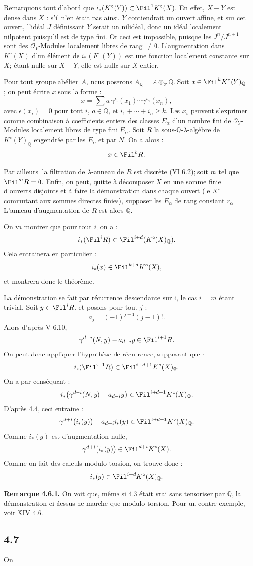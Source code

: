 Remarquons tout d'abord que \(i_*(K^\circ(Y))\subset \Fil^1K^\circ(X)\). En effet, \(X-Y\) est dense dans \(X\) : s'il n'en était pas ainsi, \(Y\) contiendrait un ouvert affine, et sur cet ouvert, l'idéal \(J\) définissant \(Y\) serait un nilidéal, donc un idéal localement nilpotent puisqu'il est de type fini. Or ceci est impossible, puisque les \(J^n/J^{n+1}\) sont des \(\mathcal O_Y\)-Modules localement libres de rang \(\ne0\). L'augmentation dans \(K^\circ(X)\) d'un élément de \(i_*(K^\circ(Y))\) est une fonction localement constante sur \(X\); étant nulle sur \(X-Y\), elle est nulle sur \(X\) entier.

Pour tout groupe abélien \(A\), nous poserons \(A_{\mathbb Q}=A\otimes_{\mathbb Z}\mathbb Q\). Soit \(x\in\Fil^kK^\circ(Y)_{\mathbb Q}\) ; on peut écrire \(x\) sous la forme :
\[
  x=\sum a\,\gamma^{i_1}(x_1)\cdots\gamma^{i_n}(x_n),
\]
avec \(\epsilon(x_i)=0\) pour tout \(i\), \(a\in\mathbb Q\), et \(i_1+\cdots+i_n\ge k\). Les \(x_i\) peuvent s'exprimer comme combinaison à coefficients entiers des classes \(E_\alpha\) d'un nombre fini de \(\mathcal O_Y\)-Modules localement libres de type fini \(E_\alpha\). Soit \(R\) la sous-\(\mathbb Q\)-\(\lambda\)-algèbre de \(K^\circ(Y)_{\mathbb Q}\) engendrée par les \(E_\alpha\) et par \(N\). On a alors :
\[
  x\in\Fil^kR.
\]

Par ailleurs, la filtration de \(\lambda\)-anneau de \(R\) est discrète (VI 6.2); soit \(m\) tel que \(\Fil^mR=0\). Enfin, on peut, quitte à décomposer \(X\) en une somme finie d'ouverts disjoints et à faire la démonstration dans chaque ouvert (le \(K^\circ\) commutant aux sommes directes finies), supposer les \(E_\alpha\) de rang constant \(r_\alpha\). L'anneau d'augmentation de \(R\) est alors \(\mathbb Q\).

On va
montrer que pour tout \(i\), on a :
\[
  i_*(\Fil^iR)\subset \Fil^{i+d}(K^\circ(X)_{\mathbb Q}).
\]
Cela entrainera en particulier :
\[
  i_*(x)\in\Fil^{k+d}K^\circ(X),
\]
et montrera donc le théorème.

La démonstration se fait par récurrence descendante sur \(i\), le cas \(i=m\) étant trivial. Soit \(y\in\Fil^iR\), et posons pour tout \(j\) :
\[
  a_j=(-1)^{j-1}(j-1)!.
\]
Alors d'après V 6.10,
\[
  \gamma^{d+i}(N,y)-a_{d+i}y\in\Fil^{i+1}R.
\]
On peut donc appliquer l'hypothèse de récurrence, supposant que :
\[
  i_*(\Fil^{i+1}R)\subset \Fil^{i+d+1}K^\circ(X)_{\mathbb Q}.
\]
On a par conséquent :
\[
  i_*\bigl(\gamma^{d+i}(N,y)-a_{d+i}y\bigr)
  \in\Fil^{i+d+1}K^\circ(X)_{\mathbb Q}.
\]
D'après 4.4, ceci entraine :
\[
  \gamma^{d+i}\bigl(i_*(y)\bigr)-a_{d+i}i_*(y)
  \in\Fil^{i+d+1}K^\circ(X)_{\mathbb Q}.
\]
Comme \(i_*(y)\) est d'augmentation nulle,
\[
  \gamma^{d+i}\bigl(i_*(y)\bigr)\in\Fil^{d+i}K^\circ(X).
\]
Comme on fait des calculs modulo torsion, on trouve donc :
\[
  i_*(y)\in\Fil^{i+d}K^\circ(X)_{\mathbb Q}.
\]

\textbf{Remarque 4.6.1.} On voit que, même si 4.3 était vrai sans tensoriser par \(\mathbb Q\), la démonstration ci-dessus ne marche que modulo torsion. Pour un contre-exemple, voir XIV 4.6.

\subsection*{4.7}

On
